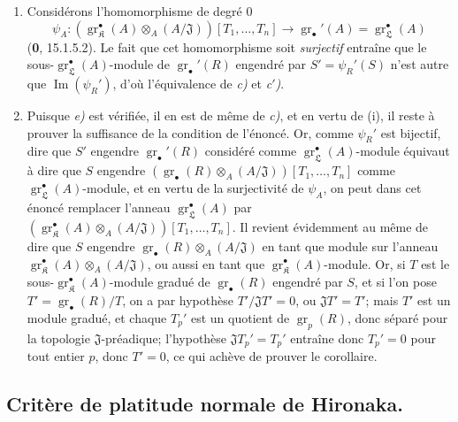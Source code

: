 \begin{enumerate}
  \item[(i)] Considérons l'homomorphisme de degré $0$
  \[
    \psi_A:(\operatorname{gr}_{\mathfrak K}^\bullet(A)\otimes_A(A/\mathfrak J))[T_1,\ldots,T_n]\longrightarrow\operatorname{gr}_\bullet'(A)=\operatorname{gr}_{\mathfrak L}^\bullet(A)
  \]
  (\textbf{0}, 15.1.5.2). Le fait que cet homomorphisme soit \emph{surjectif} entraîne que le sous-$\operatorname{gr}_{\mathfrak L}^\bullet(A)$-module de $\operatorname{gr}_\bullet'(R)$ engendré par $S'=\psi_R'(S)$ n'est autre que $\operatorname{Im}(\psi_R')$, d'où l'équivalence de \emph{c)} et \emph{c$'$)}.
  \item[(ii)] Puisque \emph{e)} est vérifiée, il en est de même de \emph{c)}, et en vertu de (i), il reste à prouver la suffisance de la condition de l'énoncé. Or, comme $\psi_R'$ est bijectif, dire que $S'$ engendre $\operatorname{gr}_\bullet'(R)$ considéré comme $\operatorname{gr}_{\mathfrak L}^\bullet(A)$-module équivaut à dire que $S$ engendre $(\operatorname{gr}_\bullet(R)\otimes_A(A/\mathfrak J))[T_1,\ldots,T_n]$ comme $\operatorname{gr}_{\mathfrak L}^\bullet(A)$-module, et en vertu de la surjectivité de $\psi_A$, on peut dans cet énoncé remplacer l'anneau $\operatorname{gr}_{\mathfrak L}^\bullet(A)$ par $(\operatorname{gr}_{\mathfrak K}^\bullet(A)\otimes_A(A/\mathfrak J))[T_1,\ldots,T_n]$. Il revient évidemment au même de dire que $S$ engendre $\operatorname{gr}_\bullet(R)\otimes_A(A/\mathfrak J)$ en tant que module sur l'anneau $\operatorname{gr}_{\mathfrak K}^\bullet(A)\otimes_A(A/\mathfrak J)$, ou aussi en tant que $\operatorname{gr}_{\mathfrak K}^\bullet(A)$-module. Or, si $T$ est le sous-$\operatorname{gr}_{\mathfrak K}^\bullet(A)$-module gradué de $\operatorname{gr}_\bullet(R)$ engendré par $S$, et si l'on pose $T'=\operatorname{gr}_\bullet(R)/T$, on a par hypothèse $T'/\mathfrak JT'=0$, ou $\mathfrak JT'=T'$; mais $T'$ est un module gradué, et chaque $T_p'$ est un quotient de $\operatorname{gr}_p(R)$, donc séparé pour la topologie $\mathfrak J$-préadique; l'hypothèse $\mathfrak JT_p'=T_p'$ entraîne donc $T_p'=0$ pour tout entier $p$, donc $T'=0$, ce qui achève de prouver le corollaire.
\end{enumerate}

\subsection{Critère de platitude normale de Hironaka.}
\label{IV.19.7}

